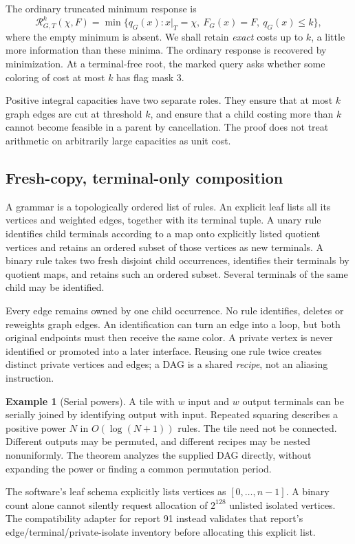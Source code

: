 \documentclass[11pt,letterpaper]{article}
\theoremstyle{definition}
\newtheorem{example}[theorem]{Example}
\theoremstyle{remark}\newtheorem{remark}[theorem]{Remark}
\newcommand{\Resp}{\mathcal R}
\begin{document}
The ordinary truncated minimum response is
\[
 \Resp^k_{G,T}(\chi,F)=\min\{q_G(x):x|_T=\chi,\ F_G(x)=F,\ q_G(x)\le k\},
\]
where the empty minimum is absent. We shall retain \emph{exact} costs up to $k$, a little more information than these minima. The ordinary response is recovered by minimization. At a terminal-free root, the marked query asks whether some coloring of cost at most $k$ has flag mask 3.

Positive integral capacities have two separate roles. They ensure that at most $k$ graph edges are cut at threshold $k$, and ensure that a child costing more than $k$ cannot become feasible in a parent by cancellation. The proof does not treat arithmetic on arbitrarily large capacities as unit cost.

\subsection{Fresh-copy, terminal-only composition}
A grammar is a topologically ordered list of rules. An explicit leaf lists all its vertices and weighted edges, together with its terminal tuple. A unary rule identifies child terminals according to a map onto explicitly listed quotient vertices and retains an ordered subset of those vertices as new terminals. A binary rule takes two fresh disjoint child occurrences, identifies their terminals by quotient maps, and retains such an ordered subset. Several terminals of the same child may be identified.

Every edge remains owned by one child occurrence. No rule identifies, deletes or reweights graph edges. An identification can turn an edge into a loop, but both original endpoints must then receive the same color. A private vertex is never identified or promoted into a later interface. Reusing one rule twice creates distinct private vertices and edges; a DAG is a shared \emph{recipe}, not an aliasing instruction.

\begin{example}[Serial powers]
A tile with $w$ input and $w$ output terminals can be serially joined by identifying output with input. Repeated squaring describes a positive power $N$ in $O(\log(N+1))$ rules. The tile need not be connected. Different outputs may be permuted, and different recipes may be nested nonuniformly. The theorem analyzes the supplied DAG directly, without expanding the power or finding a common permutation period.
\end{example}

The software's leaf schema explicitly lists vertices as $[0,\ldots,n-1]$. A binary count alone cannot silently request allocation of $2^{128}$ unlisted isolated vertices. The compatibility adapter for report 91 instead validates that report's edge/terminal/private-isolate inventory before allocating this explicit list.
\end{document}
